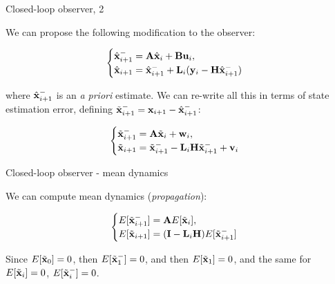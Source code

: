 \documentclass{beamer}
\begin{document}
\begin{frame}{Closed-loop observer, 2}
	\begin{flushleft}
		
		
		We can propose the following modification to the observer:
		
		\begin{equation}
			\begin{cases}
				\hat{\mathbf{x}}_{i+1}^- = \mathbf{A} \hat{\mathbf{x}}_i + \mathbf{B} \mathbf{u}_i, \\
				\hat{\mathbf{x}}_{i+1} = \hat{\mathbf{x}}_{i+1}^- + \mathbf{L}_i (\mathbf{y}_i - \mathbf{H} \hat{\mathbf{x}}_{i+1}^-)
			\end{cases}
		\end{equation}
		
		where $\hat{\mathbf{x}}_{i+1}^-$ is an \emph{a priori} estimate. We can re-write all this in terms of state estimation error, defining $\Tilde{\mathbf{x}}_{i+1}^- = \mathbf{x}_{i+1} - \hat{\mathbf{x}}_{i+1}^-$:
		
		\begin{equation}
	\begin{cases}
		\Tilde{\mathbf{x}}_{i+1}^- = \mathbf{A} \Tilde{\mathbf{x}}_i + \mathbf{w}_i, \\
		\Tilde{\mathbf{x}}_{i+1} = \Tilde{\mathbf{x}}_{i+1}^- - \mathbf{L}_i \mathbf{H} \Tilde{\mathbf{x}}_{i+1}^- + \mathbf{v}_i
	\end{cases}
		\end{equation}		
		
	\end{flushleft}
\end{frame}



\begin{frame}{Closed-loop observer - mean dynamics}
	\begin{flushleft}
		
		We can compute mean dynamics (\emph{propagation}):
		
				\begin{equation}
						\begin{cases}
								E[\Tilde{\mathbf{x}}_{i+1}^-] = \mathbf{A} E[\Tilde{\mathbf{x}}_i], \\
								E[\Tilde{\mathbf{x}}_{i+1}] = (\mathbf{I} - \mathbf{L}_i \mathbf{H}) E[\Tilde{\mathbf{x}}_{i+1}^-]
							\end{cases}
					\end{equation}		
		
		Since $E[\Tilde{\mathbf{x}}_0] = 0$, then $E[\Tilde{\mathbf{x}}_1^-] = 0$, and then $E[\Tilde{\mathbf{x}}_1] = 0$, and the same for $E[\Tilde{\mathbf{x}}_i] = 0$, $E[\Tilde{\mathbf{x}}_i^-] = 0$.
		
	\end{flushleft}
\end{frame}
\end{document}
